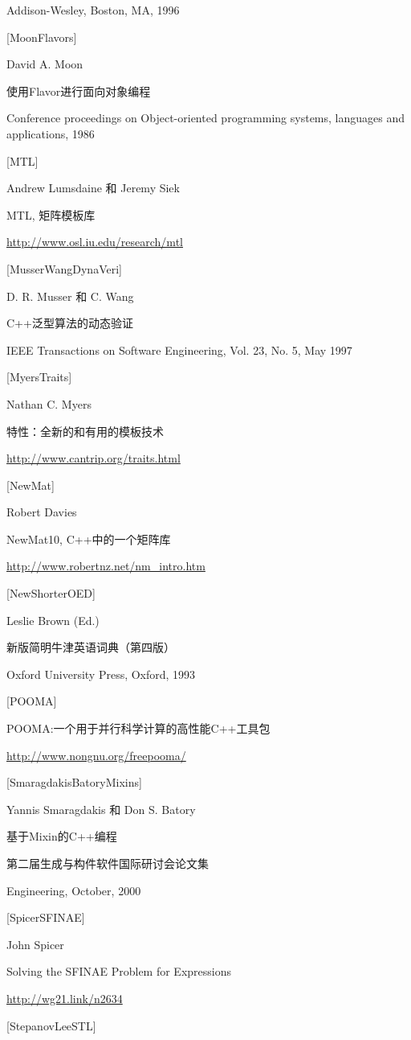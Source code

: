 Addison-Wesley, Boston, MA, 1996

{[MoonFlavors]}

David A. Moon

使用Flavor进行面向对象编程

Conference proceedings on Object-oriented programming systems, languages and applications, 1986

{[MTL]}

Andrew Lumsdaine 和 Jeremy Siek

MTL, 矩阵模板库

\url{http://www.osl.iu.edu/research/mtl}

{[MusserWangDynaVeri]}

D. R. Musser 和 C. Wang

C++泛型算法的动态验证

IEEE Transactions on Software Engineering, Vol. 23, No. 5, May 1997

{[MyersTraits]}

Nathan C. Myers

特性：全新的和有用的模板技术

\url{http://www.cantrip.org/traits.html}


{[NewMat]}

Robert Davies

NewMat10, C++中的一个矩阵库

\url{http://www.robertnz.net/nm_intro.htm}


{[NewShorterOED]}

Leslie Brown (Ed.)

新版简明牛津英语词典（第四版）

Oxford University Press, Oxford, 1993


{[POOMA]}

POOMA:一个用于并行科学计算的高性能C++工具包

\url{http://www.nongnu.org/freepooma/}


{[SmaragdakisBatoryMixins]}

Yannis Smaragdakis 和 Don S. Batory

基于Mixin的C++编程

第二届生成与构件软件国际研讨会论文集

Engineering, October, 2000


{[SpicerSFINAE]}

John Spicer

Solving the SFINAE Problem for Expressions

\url{http://wg21.link/n2634}

{[StepanovLeeSTL]}

